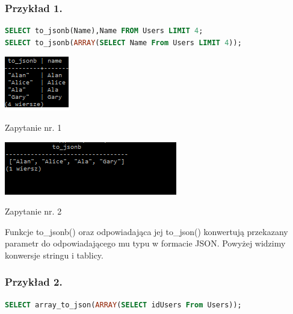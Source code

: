 \documentclass[a4paper,12pt,table]{article}
\begin{document}
{\subsubsection*{Przykład 1.}
\begin{lstlisting}[language=SQL,basicstyle=\footnotesize]
SELECT to_jsonb(Name),Name FROM Users LIMIT 4;
SELECT to_jsonb(ARRAY(SELECT Name From Users LIMIT 4));
\end{lstlisting}
\vspace{0.65cm}

\begin{minipage}{0.5\textwidth}
\makeatletter
\def\@captype{figure}
\makeatother
\begin{center}
\includegraphics[scale=1]{sc/41}
\caption{Zapytanie nr. 1}
\end{center}

\end{minipage}
\begin{minipage}{0.5\textwidth}
\makeatletter
\def\@captype{figure}
\makeatother
\begin{center}
\includegraphics[scale=1]{sc/42}
\caption{Zapytanie nr. 2}
\end{center}
\end{minipage}
\vspace{0.5cm}\newline
Funkcje to\_jsonb() oraz odpowiadająca jej to\_json() konwertują przekazany parametr do odpowiadającego mu typu w formacie JSON. Powyżej widzimy konwersje stringu i tablicy.

\subsubsection*{Przykład 2.}
\begin{lstlisting}[language=SQL,basicstyle=\footnotesize]
SELECT array_to_json(ARRAY(SELECT idUsers From Users));
\end{lstlisting}
\vspace{0.5cm}

}
\end{document}
